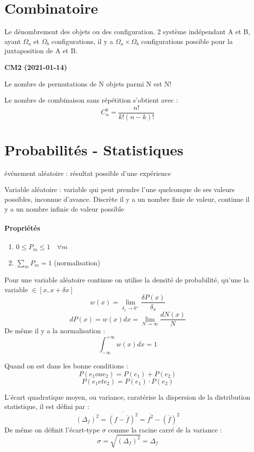 \documentclass[12pt,a4paper]{report}
\begin{document}
\section{Combinatoire}
Le dénombrement des objets ou des configuration. 2 système indépendant A et B, ayant $\Omega_a$ et $\Omega_b$ configurations, il y a \(\Omega_a \times \Omega_b\) configurations possible pour la juxtaposition de A et B.

\begin{center}
\textbf{CM2 (2021-01-14)}
\end{center}

Le nombre de permutations de N objets parmi N est N!

Le nombre de combinaison sans répétition s'obtient avec :
\[
	C^k_n = \dfrac{n!}{k!(n-k)!}
\]

\section{Probabilités - Statistiques}

événement aléatoire : résultat possible d'une expérience

Variable aléatoire : variable qui peut prendre l'une quelconque de ses valeurs possibles, inconnue d'avance. Discrète il y a un nombre finie de valeur, continue il y a un nombre infinie de valeur possible

\paragraph{Propriétés}
\begin{enumerate}
	\item \(0 \leq P_m \leq 1 \quad \forall m\)
	\item \(\sum_m P_m = 1\) (normalisation)
\end{enumerate}

Pour une variable aléatoire continue on utilise la densité de probabilité, qu'une la variable \(\in [x, x +\delta x]\)
\[
	w(x) = \lim_{\delta_x \rightarrow 0^+} \frac{\delta P(x)}{\delta_x}
\]
\[
	dP(x) = w(x)dx = \lim_{N \rightarrow \infty} \frac{dN(x)}{N}
\]
De même il y a la normalisation :
\[
	\int_{-\infty}^{+\infty} w(x)dx = 1
\]

Quand on est dans les bonne conditions :
\[
	P(e_1 ou e_2) = P(e_1) + P(e_2)
\]
\[
	P(e_1 et e_2) = P(e_1)\cdot P(e_2)
\]

L'écart quadratique moyen, ou variance, caratérise la dispersion de la distribution statistique, il est défini par :
\[
	(\Delta_f)^2 = \overline{(f - \overline{f})^2} = \overline{f^2} - (\overline{f})^2
\]
De même on définit l'écart-type \(\sigma\) comme la racine carré de la variance :
\[
	\sigma = \sqrt{(\Delta_f)^2} = \Delta_f
\]
\end{document}
